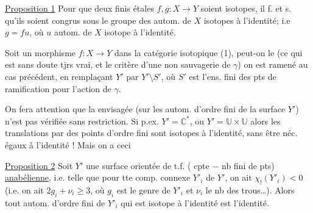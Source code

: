 \uline{Proposition 1} Pour que deux   finis étales $f,g:X\longrightarrow Y$ soient isotopes, il f. et s. qu'ils soient congrus sous le groupe des autom. de $X$ isotopes à l'identité; i.e $g=fu$, où $u$ autom. de $X$ isotope à l'identité.

Soit un  morphisme $f:X\longrightarrow Y$ dans la catégorie isotopique (1), peut-on le
(ce qui est sans doute tjrs vrai, et  le critère d'une non sauvagerie de $\gamma$) on est ramené au cas précédent, en  remplaçant $Y'$ par $Y'\setminus S'$, où $S'$ est l'ens. fini des pts de ramification pour l'action de $\gamma$. 

On fera attention que la   envisagée  (sur les autom. d'ordre fini de la surface $Y'$) n'est pas vérifiée sans restriction. Si p.ex. $Y'=\mathbb{C}^*$, ou $Y'=\mathbb{U}\times\mathbb{U}$ alors les translations par des points d'ordre fini sont isotopes à l'identité, sans être néc. égaux à l'identité ! Mais on a ceci

\uline{Proposition 2} Soit $Y'$ une surface orientée de t.f. ( cpte $-$ nb fini de pts) \uline{anabélienne}, i.e. telle que pour tte comp. connexe $Y'_i$ de $Y'$, on ait $\chi_!(Y'_i)<0$ (i.e. on ait $2g_i+\nu_i\geq 3$, où $g_i$ est le genre de $Y'_i$ et $\nu_i$ le nb des trous\ldots). Alors tout autom. \inserted{$\gamma$} d'ordre fini de $Y'_i$ qui est isotope à l'identité est l'identité.

